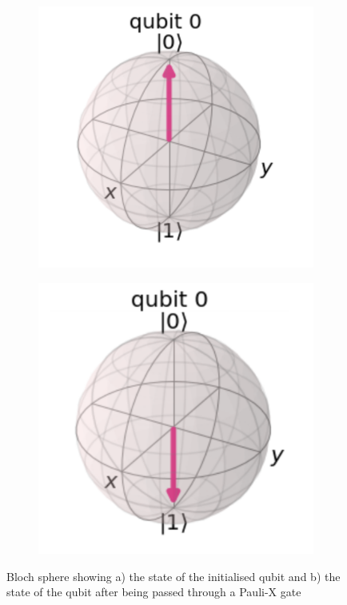 \begin{figure}[h]
    \centering
    \begin{subfigure}[h]{0.33\textwidth}
        \centering
        \includegraphics[width=\textwidth]{lab2/images/bSphX1.png}
        \caption{}
        \label{fig:bSphX1}
    \end{subfigure}
    \hspace{0.2\textwidth}
    \begin{subfigure}[h]{0.33\textwidth}
        \centering
        \includegraphics[width=\textwidth]{lab2/images/bSphX2.png}
        \caption{}
        \label{fig:bSphX2}
    \end{subfigure}
    \caption{Bloch sphere showing a) the state of the initialised qubit and b) the state of the qubit after being passed through a Pauli-X gate} 
    \label{fig:bSphereXGate}
\end{figure}

